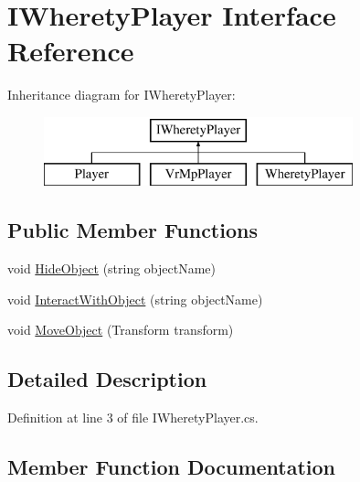 \hypertarget{interface_i_wherety_player}{}\section{I\+Wherety\+Player Interface Reference}
\label{interface_i_wherety_player}
Inheritance diagram for I\+Wherety\+Player\+:\begin{figure}[H]
\begin{center}
\leavevmode
\includegraphics[height=2.000000cm]{interface_i_wherety_player}
\end{center}
\end{figure}
\subsection*{Public Member Functions}
\begin{DoxyCompactItemize}
\item 
void \mbox{\hyperlink{interface_i_wherety_player_a2cd247a5438cb6b3142046991f39352c}{Hide\+Object}} (string object\+Name)
\item 
void \mbox{\hyperlink{interface_i_wherety_player_af8af069999158f329d99f2709b0b4fb3}{Interact\+With\+Object}} (string object\+Name)
\item 
void \mbox{\hyperlink{interface_i_wherety_player_afd5f6bbda4034e3c00502d0ac26474c1}{Move\+Object}} (Transform transform)
\end{DoxyCompactItemize}


\subsection{Detailed Description}


Definition at line 3 of file I\+Wherety\+Player.\+cs.



\subsection{Member Function Documentation}
\mbox{\label{interface_i_wherety_player_a2cd247a5438cb6b3142046991f39352c}} 
